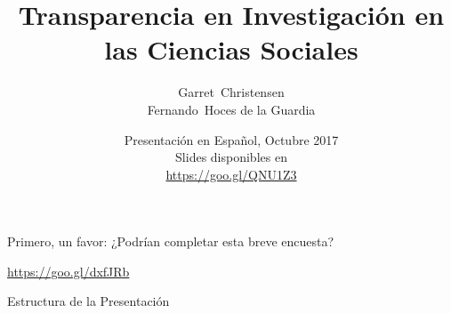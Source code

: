 \documentclass{beamer}
\title[Transparencia en Investigación en las Ciencias Sociales] %
{Transparencia en Investigación en las Ciencias Sociales}
\subtitle
{}
\author[] %
{Garret~Christensen\inst{1}\inst{2}\\
Fernando~Hoces de la Guardia\inst{1}}
\institute[Universities of Somewhere and Elsewhere] %
{
  \inst{1}%
  UC Berkeley:\\
  Berkeley Initiative for Transparency in the Social Sciences\\
  \inst{2}%
  Berkeley Institute for Data Sciences\\
}
\date[BITSS2017] %
{Presentación en Español, Octubre 2017\\
Slides disponibles en \\ \url{https://goo.gl/QNU1Z3}}
\begin{document}
\begin{frame}
  \titlepage
\end{frame}






\begin{frame}
Primero, un favor: ¿Podrían completar esta breve encuesta?

\huge{\url{https://goo.gl/dxfJRb}}


\end{frame}

\begin{frame}{Estructura de la Presentación}
  \tableofcontents
\end{frame}
\end{document}
